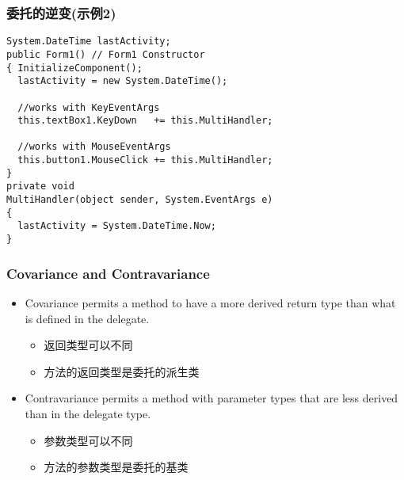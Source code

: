 \begin{frame}[fragile]
\frametitle{委托的逆变(示例2)}
\begin{lstlisting}
System.DateTime lastActivity;
public Form1() // Form1 Constructor
{ InitializeComponent();
  lastActivity = new System.DateTime();

  //works with KeyEventArgs
  this.textBox1.KeyDown   += this.MultiHandler;

  //works with MouseEventArgs
  this.button1.MouseClick += this.MultiHandler;
}
private void
MultiHandler(object sender, System.EventArgs e)
{
  lastActivity = System.DateTime.Now;
}
\end{lstlisting}
\end{frame}

\begin{frame}
\frametitle{Covariance and Contravariance}
\begin{itemize}
\setlength{\itemsep}{8pt plus 1pt}
\item Covariance permits a method to have a {\redwarn more derived} return type
  than what is defined in the delegate.
\begin{itemize}
\item 返回类型可以不同
\item 方法的返回类型是委托的派生类
\end{itemize}
\item Contravariance permits a method with parameter types that are
  {\redwarn less derived} than in the delegate type.
\begin{itemize}
\item 参数类型可以不同
\item 方法的参数类型是委托的基类
\end{itemize}
\end{itemize}
\end{frame}


